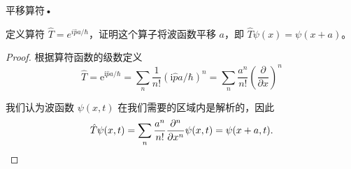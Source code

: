 \begin{4}
平移算符•

定义算符 $\hat{T}=e^{i \hat{p} a / \hbar}$，证明这个算子将波函数平移 $a$，即 $\hat{T} \psi(x)=\psi(x+a)$。
\end{4}
\begin{proof}
根据算符函数的级数定义
$$\hat{T}=\mathrm{e}^{\mathrm{i} \hat{p} a / \hbar}
=\sum_{n} \frac{1}{n!}(\mathrm{i} \hat{p} a / \hbar)^{n}
=\sum_{n} \frac{a^{n}}{n!}\left(\frac{\partial}{\partial x}\right)^{n}$$

我们认为波函数 $\psi(x, t)$ 在我们需要的区域内是解析的，因此
$$\hat{T} \psi(x, t)=\sum_{n} \frac{a^{n}}{n!} \frac{\partial^{n}}{\partial x^{n}} \psi(x, t)=\psi(x+a, t).\qedhere$$
\end{proof}



